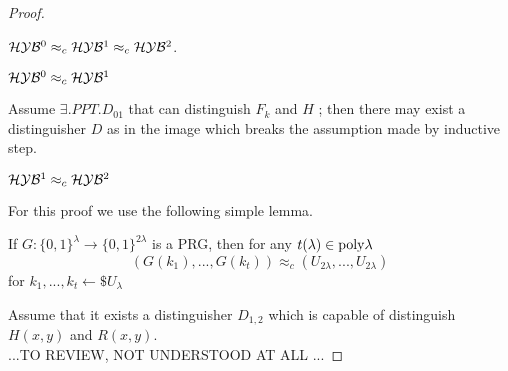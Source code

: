 \begin{proof}
    \begin{lemma}
$\mathcal{H}\mathcal{Y}\mathcal{B}^{0} \approx_{c} \mathcal{H}\mathcal{Y}\mathcal{B}^{1} \approx_{c} \mathcal{H}\mathcal{Y}\mathcal{B}^{2}$.
    \end{lemma}

    \begin{clm}
 $\mathcal{H}\mathcal{Y}\mathcal{B}^{0} \approx_{c} \mathcal{H}\mathcal{Y}\mathcal{B}^{1}$       
    \end{clm}

   Assume $ \exists .PPT. D_{01}$ that can distinguish $F_{k}$ and $H$ ; then
   there may exist a distinguisher $D$ as in the image which breaks the
   assumption made by inductive step.
\begin{figure}[h!]
   \centering
   \sdinit{}
\end{figure}

\begin{clm}
 $\mathcal{H}\mathcal{Y}\mathcal{B}^{1} \approx_{c} \mathcal{H}\mathcal{Y}\mathcal{B}^{2}$       
\end{clm}

For this proof we use the following simple lemma.
\begin{lmm}
    If $ G:\{0,1\}^{\lambda} \to \{0,1\}^{2\lambda} $ is a PRG, then for any
    $t(\lambda) \in \mathrm{poly}{\lambda} $
    \[
        (G(k_{1}), ..., G(k_{t})) \approx_{c} (U_{2\lambda}, ..., U_{2\lambda})
    \]
    for $k_{1}, ..., k_{t} \leftarrow\$ U_{\lambda}$
\end{lmm}

Assume that it exists a distinguisher $D_{1, 2}$ which is capable of distinguish
$H(x, y)$ and $R(x, y)$.\\

...TO REVIEW, NOT UNDERSTOOD AT ALL ...
\end{proof}

